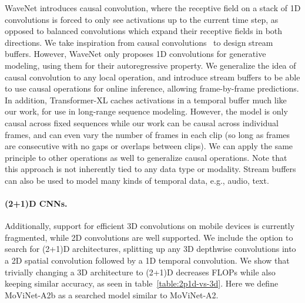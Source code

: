 \documentclass[final]{cvpr}
\newcommand{\ournet}{MoViNet\xspace} \newcommand{\ournets}{\ournet{}s\xspace}
\begin{document}
WaveNet \cite{oord2016wavenet} introduces causal convolution, where the receptive field on a stack of 1D convolutions is forced to only see activations up to the current time step, as opposed to balanced convolutions which expand their receptive fields in both directions.
We take inspiration from causal convolutions~\cite{cheng2019sparse,chang2018temporal,daiya2020stock} to design stream buffers.
However, WaveNet only proposes 1D convolutions for generative modeling, using them for their autoregressive property.
We generalize the idea of causal convolution to any local operation, and introduce stream buffers to be able to use causal operations for online inference, allowing frame-by-frame predictions.
In addition, Transformer-XL \cite{dai2019transformer} caches activations in a temporal buffer much like our work, for use in long-range sequence modeling.
However, the model is only causal across fixed sequences while our work can be causal across individual frames, and can even vary the number of frames in each clip (so long as frames are consecutive with no gaps or overlaps between clips).
We can apply the same principle to other operations as well to generalize causal operations.
Note that this approach is not inherently tied to any data type or modality.
Stream buffers can also be used to model many kinds of temporal data, e.g., audio, text.






\paragraph{(2+1)D CNNs.}
Additionally, support for efficient 3D convolutions on mobile devices is currently fragmented, while 2D convolutions are well supported.
We include the option to search for (2+1)D architectures, splitting up any 3D depthwise convolutions into a 2D spatial convolution followed by a 1D temporal convolution.
We show that trivially changing a 3D architecture to (2+1)D decreases FLOPs while also keeping similar accuracy, as seen in table~\ref{table:2p1d-vs-3d}.
Here we define \ournet-A2b as a searched model similar to \ournet-A2.


\newpage
\end{document}
